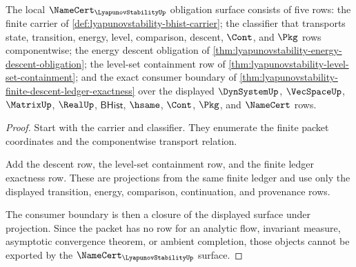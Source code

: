\begin{theorem}
\label{thm:lyapunovstability-namecert-obligation-surface}
The local $\NameCert_{\LyapunovStabilityUp}$ obligation surface consists of five rows: the finite carrier of \autoref{def:lyapunovstability-bhist-carrier}; the classifier that transports state, transition, energy, level, comparison, descent, $\Cont$, and $\Pkg$ rows componentwise; the energy descent obligation of \autoref{thm:lyapunovstability-energy-descent-obligation}; the level-set containment row of \autoref{thm:lyapunovstability-level-set-containment}; and the exact consumer boundary of \autoref{thm:lyapunovstability-finite-descent-ledger-exactness} over the displayed $\DynSystemUp$, $\VecSpaceUp$, $\MatrixUp$, $\RealUp$, $\mathsf{BHist}$, $\hsame$, $\Cont$, $\Pkg$, and $\NameCert$ rows.
\end{theorem}
\begin{proof}
Start with the carrier and classifier. They enumerate the finite packet coordinates and the componentwise transport relation.

Add the descent row, the level-set containment row, and the finite ledger exactness row. These are projections from the same finite ledger and use only the displayed transition, energy, comparison, continuation, and provenance rows.

The consumer boundary is then a closure of the displayed surface under projection. Since the packet has no row for an analytic flow, invariant measure, asymptotic convergence theorem, or ambient completion, those objects cannot be exported by the $\NameCert_{\LyapunovStabilityUp}$ surface.
\end{proof}

